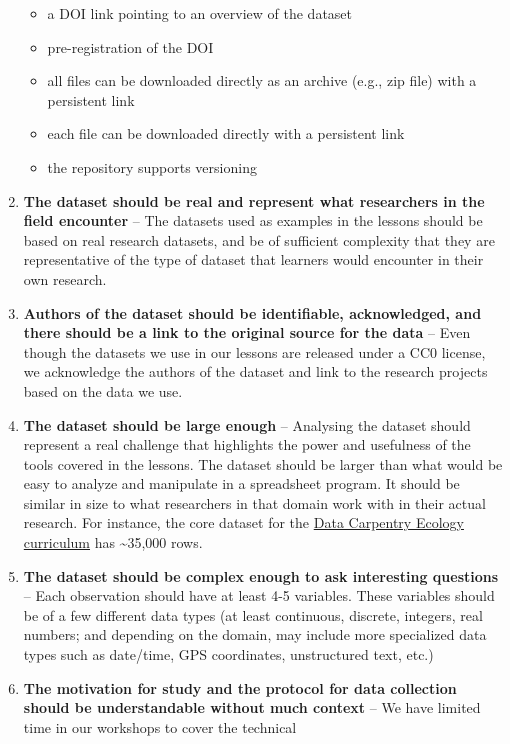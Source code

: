 \documentclass[]{book}
\providecommand{\tightlist}{%
  \setlength{\itemsep}{0pt}\setlength{\parskip}{0pt}}
\begin{document}
\begin{enumerate}
  \begin{itemize}
  \tightlist
  \item
    a DOI link pointing to an overview of the dataset
  \item
    pre-registration of the DOI
  \item
    all files can be downloaded directly as an archive (e.g., zip file) with a persistent link
  \item
    each file can be downloaded directly with a persistent link
  \item
    the repository supports versioning
  \end{itemize}
\item
  \textbf{The dataset should be real and represent what researchers in the field encounter} --
  The datasets used as examples in the
  lessons should be based on real research datasets, and be of sufficient complexity that they
  are representative of the type of dataset that learners would encounter in their own
  research.
\item
  \textbf{Authors of the dataset should be identifiable, acknowledged, and there should be a link to the original source for the data} -- Even though the datasets we use in our lessons are
  released under a CC0 license, we acknowledge the authors of the dataset and link to
  the research projects based on the data we use.
\item
  \textbf{The dataset should be large enough} -- Analysing the dataset should represent a real
  challenge that
  highlights the power and usefulness of the tools covered in the lessons. The dataset should
  be larger than what would be easy to analyze and manipulate in a spreadsheet program. It
  should be similar in size to what researchers in that domain work with in their actual
  research. For instance, the core dataset for the \href{https://datacarpentry.org/ecology-workshop/data/}{Data Carpentry Ecology curriculum} has \textasciitilde{}35,000 rows.
\item
  \textbf{The dataset should be complex enough to ask interesting questions} -- Each observation
  should have at least 4-5 variables. These variables should be of a few
  different data types (at least continuous, discrete, integers, real numbers; and depending
  on the domain, may include more specialized data types such as date/time, GPS coordinates, unstructured text, etc.)
\item
  \textbf{The motivation for study and the protocol for data collection should be understandable without much context} -- We have limited time in our workshops to cover the technical

\end{enumerate}
\end{document}
